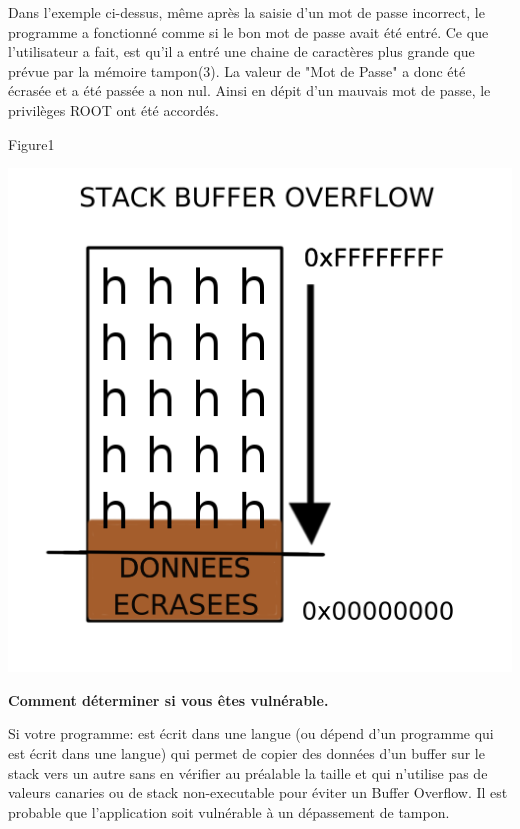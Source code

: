 \begin{flushleft}
Dans l'exemple ci-dessus, même après la saisie d'un mot de passe incorrect, le programme a fonctionné comme si le bon mot de passe avait été entré.
Ce que l'utilisateur a fait, est qu'il a entré une chaine de caractères plus grande que prévue par la mémoire tampon(3). La valeur de "Mot de Passe" a donc été écrasée et a été passée a non nul. Ainsi en dépit d'un mauvais mot de passe, le privilèges ROOT ont été accordés.
\end{flushleft}

\begin{center}
\caption{Figure1}
\includegraphics[scale=2]{Application/assets/bo40.png}
\end{center}


\begin{flushleft}
\textbf{Comment déterminer si vous êtes vulnérable.}
\end{flushleft}

\begin{flushleft}
Si votre programme:
est écrit dans une langue (ou dépend d'un programme qui est écrit dans une langue) qui permet de copier des données d'un buffer sur le stack vers un autre sans en vérifier au préalable la taille et qui n'utilise pas de valeurs canaries ou de stack non-executable pour éviter un Buffer Overflow. Il est probable que l'application soit vulnérable à un dépassement de tampon.
\end{flushleft}

